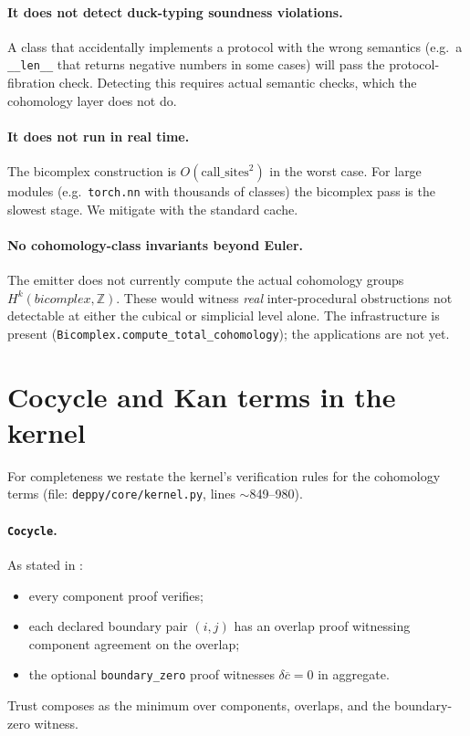 \paragraph{It does not detect duck-typing soundness violations.}  A
class that accidentally implements a protocol with the wrong
semantics (e.g.\ a \texttt{\_\_len\_\_} that returns negative
numbers in some cases) will pass the protocol-fibration check.
Detecting this requires actual semantic checks, which the cohomology
layer does not do.

\paragraph{It does not run in real time.}  The bicomplex
construction is $O(\text{call\_sites}^2)$ in the worst case.  For
large modules (e.g.\ \texttt{torch.nn} with thousands of
classes) the bicomplex pass is the slowest stage.  We mitigate
with the standard cache.

\paragraph{No cohomology-class invariants beyond Euler.}  The
emitter does not currently compute the actual cohomology groups
$H^k(\textit{bicomplex}, \mathbb{Z})$.  These would witness
\emph{real} inter-procedural obstructions not detectable at either
the cubical or simplicial level alone.  The infrastructure is
present (\texttt{Bicomplex.compute\_total\_cohomology}); the
applications are not yet.

\section{Cocycle and Kan terms in the kernel}

For completeness we restate the kernel's verification rules for
the cohomology terms (file:
\texttt{deppy/core/kernel.py}, lines $\sim$849--980).

\paragraph{\texttt{Cocycle}.}  As stated in :
\begin{itemize}[leftmargin=1.7em]
  \item every component proof verifies;
  \item each declared boundary pair $(i, j)$ has an overlap proof
    witnessing component agreement on the overlap;
  \item the optional \texttt{boundary\_zero} proof witnesses
    $\delta\overline{c} = 0$ in aggregate.
\end{itemize}
Trust composes as the minimum over components, overlaps, and the
boundary-zero witness.

